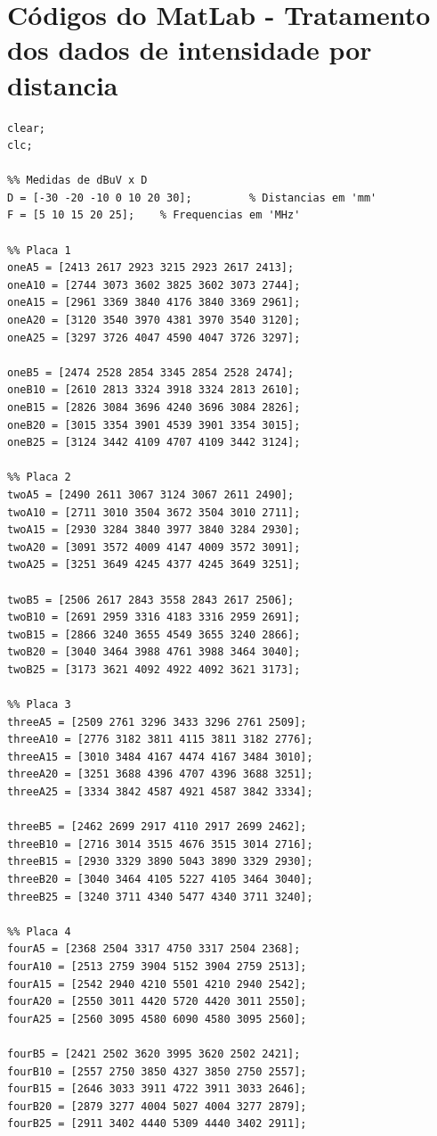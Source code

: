 \section{Códigos do MatLab - Tratamento dos dados de intensidade por distancia}
\begin{lstlisting}
clear;
clc;

%% Medidas de dBuV x D
D = [-30 -20 -10 0 10 20 30];         % Distancias em 'mm'
F = [5 10 15 20 25];    % Frequencias em 'MHz'

%% Placa 1
oneA5 = [2413 2617 2923 3215 2923 2617 2413];            
oneA10 = [2744 3073 3602 3825 3602 3073 2744];
oneA15 = [2961 3369 3840 4176 3840 3369 2961];
oneA20 = [3120 3540 3970 4381 3970 3540 3120];
oneA25 = [3297 3726 4047 4590 4047 3726 3297];

oneB5 = [2474 2528 2854 3345 2854 2528 2474];
oneB10 = [2610 2813 3324 3918 3324 2813 2610];
oneB15 = [2826 3084 3696 4240 3696 3084 2826];
oneB20 = [3015 3354 3901 4539 3901 3354 3015];
oneB25 = [3124 3442 4109 4707 4109 3442 3124];

%% Placa 2
twoA5 = [2490 2611 3067 3124 3067 2611 2490];
twoA10 = [2711 3010 3504 3672 3504 3010 2711];
twoA15 = [2930 3284 3840 3977 3840 3284 2930];
twoA20 = [3091 3572 4009 4147 4009 3572 3091];
twoA25 = [3251 3649 4245 4377 4245 3649 3251];

twoB5 = [2506 2617 2843 3558 2843 2617 2506];
twoB10 = [2691 2959 3316 4183 3316 2959 2691];
twoB15 = [2866 3240 3655 4549 3655 3240 2866];
twoB20 = [3040 3464 3988 4761 3988 3464 3040];
twoB25 = [3173 3621 4092 4922 4092 3621 3173];

%% Placa 3
threeA5 = [2509 2761 3296 3433 3296 2761 2509];
threeA10 = [2776 3182 3811 4115 3811 3182 2776];
threeA15 = [3010 3484 4167 4474 4167 3484 3010];
threeA20 = [3251 3688 4396 4707 4396 3688 3251];
threeA25 = [3334 3842 4587 4921 4587 3842 3334];

threeB5 = [2462 2699 2917 4110 2917 2699 2462];
threeB10 = [2716 3014 3515 4676 3515 3014 2716];
threeB15 = [2930 3329 3890 5043 3890 3329 2930];
threeB20 = [3040 3464 4105 5227 4105 3464 3040];
threeB25 = [3240 3711 4340 5477 4340 3711 3240];

%% Placa 4
fourA5 = [2368 2504 3317 4750 3317 2504 2368];
fourA10 = [2513 2759 3904 5152 3904 2759 2513];
fourA15 = [2542 2940 4210 5501 4210 2940 2542];
fourA20 = [2550 3011 4420 5720 4420 3011 2550];
fourA25 = [2560 3095 4580 6090 4580 3095 2560];

fourB5 = [2421 2502 3620 3995 3620 2502 2421];
fourB10 = [2557 2750 3850 4327 3850 2750 2557];
fourB15 = [2646 3033 3911 4722 3911 3033 2646];
fourB20 = [2879 3277 4004 5027 4004 3277 2879];
fourB25 = [2911 3402 4440 5309 4440 3402 2911];


\end{lstlisting}
